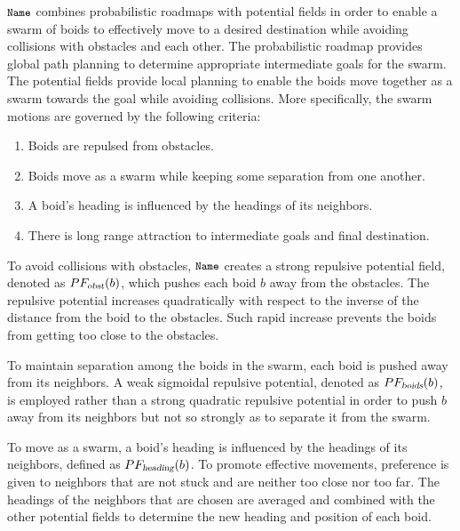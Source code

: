 \documentclass{llncs}
\newcommand{\Acronym}[1]{\ensuremath{{\small{\texttt{#1}}}}}
\newcommand{\Var}[1]{\ensuremath{{\small{\textsl{#1}}}}}
\newcommand{\Name}{\Acronym{Name}}
\begin{document}
$\Name$ combines probabilistic roadmaps with potential fields in order
to enable a swarm of boids to effectively move to a desired
destination while avoiding collisions with obstacles and each other.
The probabilistic roadmap provides global path planning to determine
appropriate intermediate goals for the swarm. The potential
fields provide local planning to enable the boids move together as a swarm
towards the goal while avoiding collisions. More specifically, the swarm
motions are governed by the following criteria:
\begin{enumerate}
\item Boids are repulsed from obstacles.
\item Boids move as a swarm while keeping some separation from one another.
\item A boid's heading is influenced by the headings of its neighbors.
\item There is long range attraction to intermediate goals and final destination. 
\end{enumerate}
To avoid collisions with obstacles, $\Name$ creates a strong repulsive potential
field, denoted as $PF_\Var{obst}(b)$, which
pushes each boid $b$ away from the obstacles. The repulsive potential
increases quadratically with respect to the inverse of the distance
from the boid to the obstacles. Such rapid increase prevents the boids
from getting too close to the obstacles. 

To maintain separation among the boids in the swarm, each boid is
pushed away from its neighbors. A weak sigmoidal repulsive
potential, denoted as $PF_\Var{boids}(b)$, is employed rather than a
strong quadratic repulsive potential in order to push $b$ away
from its neighbors but not so strongly as to separate it from the
swarm.

To move as a swarm, a boid's heading is influenced by the headings of
its neighbors, defined as $PF_\Var{heading}(b)$. To promote effective
movements, preference is given to neighbors that are not
stuck and are neither too close nor too far. The headings of the
neighbors that are chosen are averaged and combined with the other
potential fields to determine the new heading and position of each
boid.
\end{document}
